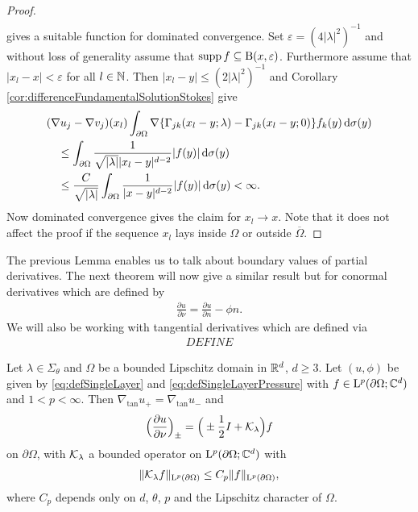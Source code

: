 \begin{proof}
\begin{align*}
  \end{align*}
  gives a suitable function for dominated convergence.
  Set $\varepsilon = (4 |\lambda|^2)^{-1}$ and without loss of generality assume that $\operatorname{supp} f \subseteq \mathrm{B}(x,\varepsilon)$.
  Furthermore assume that $|x_l - x| < \varepsilon$ for all $l \in \mathbb{N}$.
  Then $|x_l - y| \leq (2|\lambda|^2)^{-1}$ and Corollary \ref{cor:differenceFundamentalSolutionStokes} give
  \begin{align*}
    & (\nabla u_j - \nabla v_j)(x_l) \int_{\partial\Omega} \nabla \{ \Gamma_{jk}(x_l - y; \lambda) - \Gamma_{jk}(x_l - y; 0)\} f_k(y) \, {\operatorname{d}\!{\sigma}}(y) \\
    &\quad\leq \int_{\partial\Omega} \frac{1}{\sqrt{|\lambda|}|x_l - y|^{d - 2}} |f(y)| \, {\operatorname{d}\!{\sigma}}(y) \\
    &\quad\leq \frac{C}{\sqrt{|\lambda|}} \int_{\partial\Omega} \frac{1}{|x - y|^{d - 2}} |f(y)| \, {\operatorname{d}\!{\sigma}}(y) < \infty.
  \end{align*}
  Now dominated convergence gives the claim for $x_l \to x$.
  Note that it does not affect the proof if the sequence $x_l$ lays inside $\Omega$ or outside $\overline\Omega$.
\end{proof}

The previous Lemma enables us to talk about boundary values of partial derivatives. 
The next theorem will now give a similar result but for conormal derivatives which are defined by
\begin{align*}
  \frac{\partial u}{\partial \nu} = \frac{\partial u}{\partial n} - \phi n.
\end{align*}
We will also be working with tangential derivatives which are defined via
\begin{align*}
  DEFINE
\end{align*}

\begin{thm}
  \label{thm:jumpConditions}
  Let $\lambda \in \Sigma_\theta$ and $\Omega$ be a bounded Lipschitz domain in $\mathbb{R}^d$, $d \geq 3$. 
  Let $(u,\phi)$ be given by \eqref{eq:defSingleLayer} and \eqref{eq:defSingleLayerPressure} with $f \in \mathrm{L}^p(\partial\Omega; \mathbb{C}^d)$ and $1 < p < \infty$.
  Then $\nabla_{\mathrm{tan}} u_+ = \nabla_{\mathrm{tan}} u_-$ and
  \begin{align}
    \label{eq:nontangentialConormalDerivative}
    \Big( \frac{\partial u}{\partial \nu} \Big)_\pm = \Big( \pm \frac{1}{2} I + \mathcal{K}_\lambda \Big) f
  \end{align}
  on $\partial\Omega$, with $\mathcal{K}_\lambda$ a bounded operator on $\mathrm{L}^p(\partial\Omega; \mathbb{C}^d)$ with
  \begin{align*}
    \| \mathcal{K}_\lambda f \|_{\mathrm{L}^p(\partial\Omega)} \leq C_p \|f\|_{\mathrm{L}^p(\partial\Omega)},
  \end{align*}
  where $C_p$ depends only on $d$, $\theta$, $p$ and the Lipschitz character of $\Omega$.
\end{thm}


